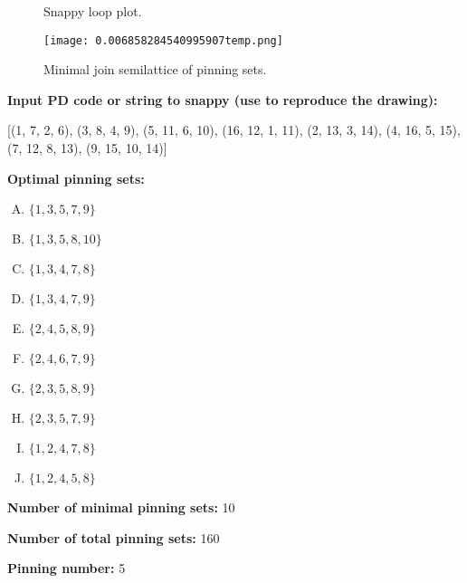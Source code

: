 \documentclass{article}%
\begin{document}
\begin{multicols}{2}
\begin{figure}[H]
\centering

\caption{Snappy loop plot.}
\label{fig:0.8098667864827003temp.svg}
\end{figure}\columnbreak

\begin{figure}[H]
\centering
\texttt{[image: 0.006858284540995907temp.png]}
\caption{Minimal join semilattice of pinning sets.}
\label{fig:0.006858284540995907temp.png}
\end{figure}\end{multicols}\newpage\begin{multicols}{2}

\columnbreak

\noindent\textbf{Input PD code or string to snappy (use to reproduce the drawing):}

	[(1, 7, 2, 6), (3, 8, 4, 9), (5, 11, 6, 10), (16, 12, 1, 11), (2, 13, 3, 14), (4, 16, 5, 15), (7, 12, 8, 13), (9, 15, 10, 14)]

\noindent\textbf{Optimal pinning sets:}

\begin{enumerate}[A)]
\item{\Huge\textcolor{red0}{\textbullet}}$\{1,3,5,7,9\}$

\item{\Huge\textcolor{red1}{\textbullet}}$\{1,3,5,8,10\}$

\item{\Huge\textcolor{red2}{\textbullet}}$\{1,3,4,7,8\}$

\item{\Huge\textcolor{red3}{\textbullet}}$\{1,3,4,7,9\}$

\item{\Huge\textcolor{red4}{\textbullet}}$\{2,4,5,8,9\}$

\item{\Huge\textcolor{red5}{\textbullet}}$\{2,4,6,7,9\}$

\item{\Huge\textcolor{red6}{\textbullet}}$\{2,3,5,8,9\}$

\item{\Huge\textcolor{red7}{\textbullet}}$\{2,3,5,7,9\}$

\item{\Huge\textcolor{red8}{\textbullet}}$\{1,2,4,7,8\}$

\item{\Huge\textcolor{red9}{\textbullet}}$\{1,2,4,5,8\}$

\end{enumerate}


\noindent\textbf{Number of minimal pinning sets:} 10

\noindent\textbf{Number of total pinning sets:} 160

\noindent\textbf{Pinning number:} 5


\end{multicols}
\end{document}
